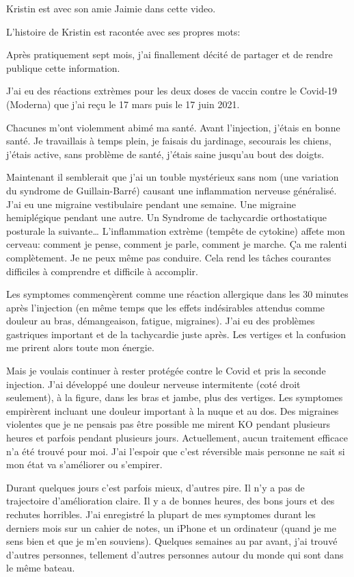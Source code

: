 Kristin est avec son amie Jaimie dans cette video.

L'histoire de Kristin est racontée avec ses propres mots:

Après pratiquement sept mois, j'ai finallement décité de partager et de rendre
publique cette information.

J'ai eu des réactions extrèmes pour les deux doses de vaccin contre le Covid-19
(Moderna) que j'ai reçu le 17 mars puis le 17 juin 2021.

Chacunes m'ont violemment abimé ma santé. Avant l'injection, j'étais en bonne
santé. Je travaillais à temps plein, je faisais du jardinage, secourais les
chiens, j'étais active, sans problème de santé, j'étais saine jusqu'au bout des
doigts.

Maintenant il semblerait que j'ai un touble mystérieux sans nom (une variation
du syndrome de Guillain-Barré) causant une inflammation nerveuse
généralisé. J'ai eu une migraine vestibulaire pendant une semaine. Une migraine
hemiplégique pendant une autre. Un Syndrome de tachycardie orthostatique
posturale la suivante… L'inflammation extrème (tempête de cytokine) affete mon
cerveau: comment je pense, comment je parle, comment je marche. Ça me ralenti
complètement. Je ne peux même pas conduire. Cela rend les tâches courantes
difficiles à comprendre et difficile à accomplir.

Les symptomes commençèrent comme une réaction allergique dans les 30 minutes
après l'injection (en même temps que les effets indésirables attendus comme
douleur au bras, démangeaison, fatigue, migraines). J'ai eu des problèmes
gastriques important et de la tachycardie juste après. Les vertiges et la
confusion me prirent alors toute mon énergie.

Mais je voulais continuer à rester protégée contre le Covid et pris la seconde
injection. J'ai développé une douleur nerveuse intermitente (coté droit
seulement), à la figure, dans les bras et jambe, plus des vertiges. Les
symptomes empirèrent incluant une douleur important à la nuque et au dos. Des
migraines violentes que je ne pensais pas être possible me mirent KO pendant
plusieurs heures et parfois pendant plusieurs jours. Actuellement, aucun
traitement efficace n'a été trouvé pour moi. J'ai l'espoir que c'est réversible
mais personne ne sait si mon état va s'améliorer ou s'empirer.

Durant quelques jours c'est parfois mieux, d'autres pire. Il n'y a pas de
trajectoire d'amélioration claire. Il y a de bonnes heures, des bons jours et
des rechutes horribles. J'ai enregistré la plupart de mes symptomes durant les
derniers mois sur un cahier de notes, un iPhone et un ordinateur (quand je me
sens bien et que je m'en souviens). Quelques semaines au par avant, j'ai trouvé
d'autres personnes, tellement d'autres personnes autour du monde qui sont dans
le même bateau.

